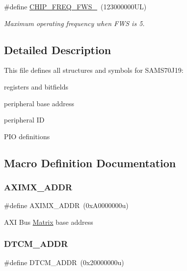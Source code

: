 \begin{DoxyCompactItemize}
\mbox{\label{group__SAMS70J19__definitions_ga3b66824f858591135877b369f98d48a5}} 
\#define \mbox{\hyperlink{group__SAMS70J19__definitions_ga3b66824f858591135877b369f98d48a5}{C\+H\+I\+P\+\_\+\+F\+R\+E\+Q\+\_\+\+F\+W\+S\+\_}}~(123000000\+U\+L)
\begin{DoxyCompactList}\small\item\em Maximum operating frequency when F\+WS is 5. \end{DoxyCompactList}\end{DoxyCompactItemize}


\subsection{Detailed Description}
This file defines all structures and symbols for S\+A\+M\+S70\+J19\+:
\begin{DoxyItemize}
\item registers and bitfields
\item peripheral base address
\item peripheral ID
\item P\+IO definitions 
\end{DoxyItemize}

\subsection{Macro Definition Documentation}
\mbox{\label{group__SAMS70J19__definitions_ga2fb7cc681bf5e7fbce5e3635b72a330a}} 
\subsubsection{\texorpdfstring{AXIMX\_ADDR}{AXIMX\_ADDR}}
{\footnotesize\ttfamily \#define A\+X\+I\+M\+X\+\_\+\+A\+D\+DR~(0x\+A0000000u)}

A\+XI Bus \mbox{\hyperlink{structMatrix}{Matrix}} base address \mbox{\label{group__SAMS70J19__definitions_ga26626a425f7ebb3a0c2dbc276f0d9f78}} 
\subsubsection{\texorpdfstring{DTCM\_ADDR}{DTCM\_ADDR}}
{\footnotesize\ttfamily \#define D\+T\+C\+M\+\_\+\+A\+D\+DR~(0x20000000u)}

